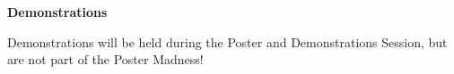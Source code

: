 \noindent
\vspace{1em}\par\centerline{\bfseries\large Demonstrations}\vspace{1em}\par
{}

Demonstrations will be held during the Poster and Demonstrations Session, but are not part of the
Poster Madness!

\noindent

